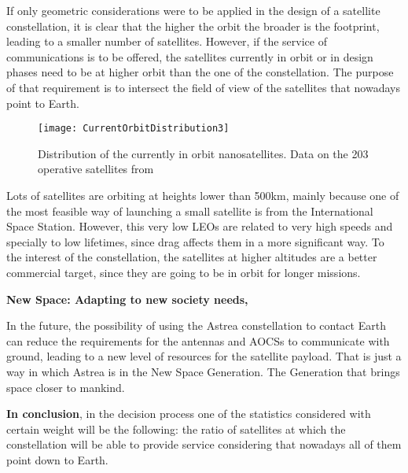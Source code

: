 \begin{minipage}{0.45\textwidth}
If only geometric considerations were to be applied in the design of a satellite constellation, it is clear that the higher the orbit the broader is the footprint,  leading to a smaller number of satellites. However, if the service of communications is to be offered, the satellites currently in orbit or in design phases need to be at higher orbit than the one of the constellation. The purpose of that requirement is to intersect the field of view of the satellites that nowadays point to Earth.
\end{minipage}
\begin{minipage}{0.5\textwidth}

\begin{figure}[H]
\centering
	\texttt{[image: CurrentOrbitDistribution3]}
	\caption{Distribution of the currently in orbit nanosatellites. Data on the 203 operative satellites from \cite{nanosats}}	
\end{figure}
\end{minipage}
Lots of satellites are orbiting at heights lower than 500km, mainly because one of the most feasible way of launching a small satellite is from the International Space Station. However, this very low LEOs are related to very high speeds and specially to low lifetimes, since drag affects them in a more significant way. To the interest of the constellation, the satellites at higher altitudes are a better commercial target, since they are going to be in orbit for longer missions.

\textbf{New Space: Adapting to new society needs,}

In the future, the possibility of using the Astrea constellation to contact Earth can reduce the requirements for the antennas and AOCSs to communicate with ground, leading to a new level of resources for the satellite payload. That is just a way in which Astrea is in the New Space Generation. The Generation that brings space closer to mankind.

\textbf{In conclusion}, in the decision process one of the statistics considered with certain weight will be the following: the ratio of satellites at which the constellation will be able to provide service considering that nowadays all of them point down to Earth. 